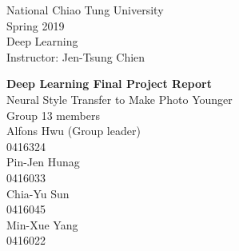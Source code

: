 


\begin{titlepage} %

	
\begin{minipage}{0.4\textwidth} %
    \begin{flushleft} %
    \large
    National Chiao Tung University\\ %
    Spring 2019 \\ %
    Deep Learning \\ %
    Instructor: Jen-Tsung Chien\\ %
    \end{flushleft}
\end{minipage}
	
\vspace*{2in} %
	
\center %

	
{\huge\bfseries Deep Learning Final Project Report}\\[0.4cm] %
{\Large Neural Style Transfer to Make Photo Younger}
\\{\large Group 13 members}
\\
Alfons Hwu (Group leader) \\ %
0416324\\
Pin-Jen Hunag \\ %
0416033\\
Chia-Yu Sun \\ %
0416045\\
Min-Xue Yang\\ %
0416022\\
\vfill %


\end{titlepage}
